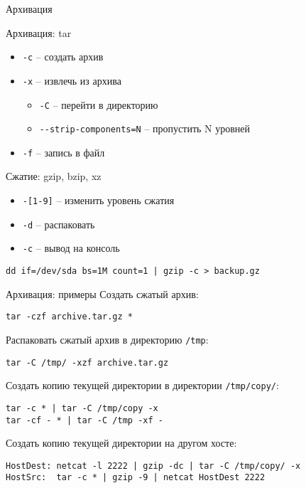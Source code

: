 \begin{frame}[fragile]{Архивация}
	\begin{block}{Архивация: tar}
		\begin{itemize}
			\item {\tt -c} -- создать архив
			\item {\tt -x} -- извлечь из архива
				\begin{itemize}
					\item {\tt -C} -- перейти в директорию
					\item {\tt -{}-strip-components=N} -- пропустить N уровней
				\end{itemize}
			\item {\tt -f} -- запись в файл
		\end{itemize}
	\end{block}

	\begin{block}{Сжатие: gzip, bzip, xz}
		\begin{itemize}
			\item {\tt -[1-9]} -- изменить уровень сжатия
			\item {\tt -d} -- распаковать
			\item {\tt -c} -- вывод на консоль
		\end{itemize}
		\begin{verbatim}
dd if=/dev/sda bs=1M count=1 | gzip -c > backup.gz
    \end{verbatim}
	\end{block}

\end{frame}

\begin{frame}[fragile]{Архивация: примеры}
	Создать сжатый архив:
	\begin{verbatim}
tar -czf archive.tar.gz *
        \end{verbatim}
	\pause
	Распаковать сжатый архив в директорию {\tt /tmp}:
	\begin{verbatim}
tar -C /tmp/ -xzf archive.tar.gz
        \end{verbatim}
	\pause
	Создать копию текущей директории в директории {\tt /tmp/copy/}:
	\begin{verbatim}
tar -c * | tar -C /tmp/copy -x
tar -cf - * | tar -C /tmp -xf -
        \end{verbatim}
	\pause
	Создать копию текущей директории на другом хосте:
	\begin{verbatim}
HostDest: netcat -l 2222 | gzip -dc | tar -C /tmp/copy/ -x
HostSrc:  tar -c * | gzip -9 | netcat HostDest 2222
        \end{verbatim}
\end{frame}
